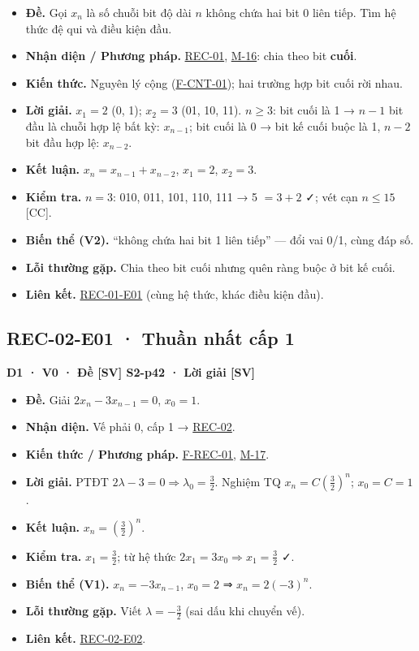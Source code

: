\documentclass[
  10pt,
  twoside,openany]{book}
\providecommand{\tightlist}{%
  \setlength{\itemsep}{0pt}\setlength{\parskip}{0pt}}
\begin{document}
\begin{itemize}
\tightlist
\item
  \textbf{Đề.} Gọi \(x_n\) là số chuỗi bit độ dài \(n\) không chứa hai
  bit 0 liên tiếp. Tìm hệ thức đệ qui và điều kiện đầu.
\item
  \textbf{Nhận diện / Phương pháp.} \protect\hyperlink{REC-01}{REC-01},
  \protect\hyperlink{M-16}{M-16}: chia theo bit \textbf{cuối}.
\item
  \textbf{Kiến thức.} Nguyên lý cộng
  (\protect\hyperlink{F-CNT-01}{F-CNT-01}); hai trường hợp bit cuối rời
  nhau.
\item
  \textbf{Lời giải.} \(x_1=2\) (0, 1); \(x_2=3\) (01, 10, 11).
  \(n\ge3\): bit cuối là 1 → \(n-1\) bit đầu là chuỗi hợp lệ bất kỳ:
  \(x_{n-1}\); bit cuối là 0 → bit kế cuối buộc là 1, \(n-2\) bit đầu
  hợp lệ: \(x_{n-2}\).
\item
  \textbf{Kết luận.} \(x_n=x_{n-1}+x_{n-2}\), \(x_1=2\), \(x_2=3\).
\item
  \textbf{Kiểm tra.} \(n=3\): 010, 011, 101, 110, 111 → 5 \(=3+2\) ✓;
  vét cạn \(n\le15\) {[}CC{]}.
\item
  \textbf{Biến thể (V2).} ``không chứa hai bit 1 liên tiếp'' --- đổi vai
  0/1, cùng đáp số.
\item
  \textbf{Lỗi thường gặp.} Chia theo bit cuối nhưng quên ràng buộc ở bit
  kế cuối.
\item
  \textbf{Liên kết.} \protect\hyperlink{REC-01-E01}{REC-01-E01} (cùng hệ
  thức, khác điều kiện đầu).
\end{itemize}

\hypertarget{REC-02-E01}{%
\subsection{REC-02-E01 · Thuần nhất cấp 1}\label{REC-02-E01}}

\textbf{D1 · V0 · Đề {[}SV{]} S2-p42 · Lời giải {[}SV{]}}

\begin{itemize}
\tightlist
\item
  \textbf{Đề.} Giải \(2x_n-3x_{n-1}=0\), \(x_0=1\).
\item
  \textbf{Nhận diện.} Vế phải 0, cấp 1 →
  \protect\hyperlink{REC-02}{REC-02}.
\item
  \textbf{Kiến thức / Phương pháp.}
  \protect\hyperlink{F-REC-01}{F-REC-01},
  \protect\hyperlink{M-17}{M-17}.
\item
  \textbf{Lời giải.} PTĐT \(2\lambda-3=0\Rightarrow\lambda_0=\frac32\).
  Nghiệm TQ \(x_n=C\left(\frac32\right)^n\); \(x_0=C=1\).
\item
  \textbf{Kết luận.} \(x_n=\left(\frac32\right)^n\).
\item
  \textbf{Kiểm tra.} \(x_1=\frac32\); từ hệ thức
  \(2x_1=3x_0\Rightarrow x_1=\frac32\) ✓.
\item
  \textbf{Biến thể (V1).} \(x_n=-3x_{n-1}\), \(x_0=2\) ⇒
  \(x_n=2(-3)^n\).
\item
  \textbf{Lỗi thường gặp.} Viết \(\lambda=-\frac32\) (sai dấu khi chuyển
  vế).
\item
  \textbf{Liên kết.} \protect\hyperlink{REC-02-E02}{REC-02-E02}.
\end{itemize}
\end{document}

